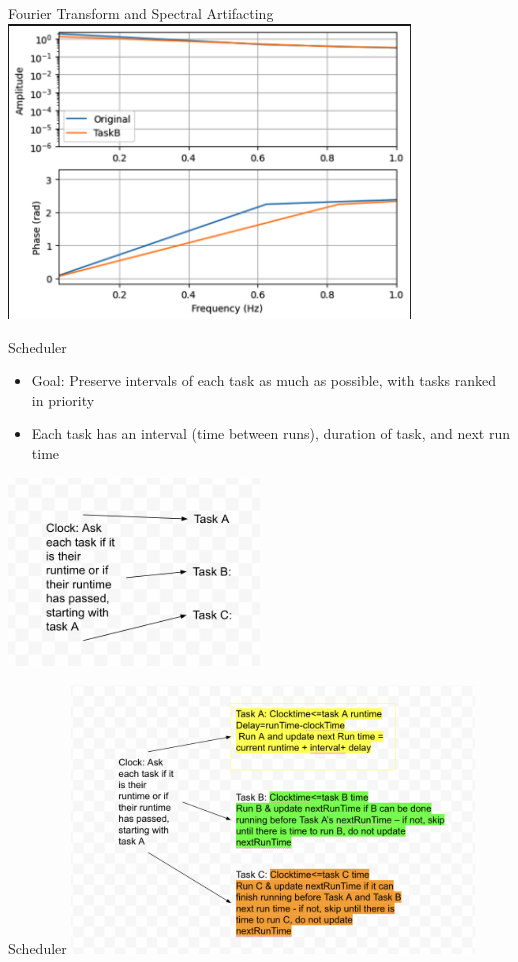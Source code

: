 \begin{frame}{Fourier Transform and Spectral Artifacting}
    \centering
    \includegraphics[height=0.8\textheight,width=0.8\textwidth,keepaspectratio]{images/Amp_Vs_Freq.png}
\end{frame}

\begin{frame}{Scheduler}
    \begin{itemize}
        \item Goal: Preserve intervals of each task as much as possible, with tasks ranked in priority
        \item Each task has an interval (time between runs), duration of task, and next run time 
    \end{itemize} 
    \includegraphics[height=0.5\textheight,width=0.5\textwidth,keepaspectratio]{images/schedulerPart1.png}
   
\end{frame}

\begin{frame}{Scheduler}
    \includegraphics[height=0.8\textheight,width=0.8\textwidth,keepaspectratio]{images/schedulerPart2.png}
   
\end{frame}

